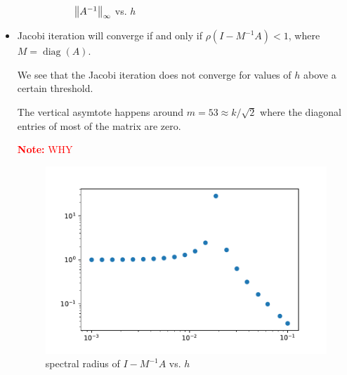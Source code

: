 \documentclass[10pt]{article}
\newcommand{\note}[1]{\textcolor{red}{\textbf{Note:} #1}}
\begin{document}
\begin{solution}[Solution]
\begin{itemize}
\begin{figure}[H]
\begin{subfigure}{.3\textwidth}
    \caption{\( \left\lVert A^{-1}\right\rVert_\infty \) vs. \( h \)}
\end{subfigure}
\caption{}
\label{}
\end{figure}


\item Jacobi iteration will converge if and only if \( \rho(I-M^{-1}A) < 1 \), where \( M = \operatorname{diag}(A) \).

We see that the Jacobi iteration does not converge for values of \( h \) above a certain threshold.

The vertical asymtote happens around \( m=53 \approx k/\sqrt{2} \) where the diagonal entries of most of the matrix are zero.

\note{WHY}

\begin{figure}[H]\centering
\includegraphics[width=.5\textwidth]{code/spect.pdf}
\caption{spectral radius of \( I-M^{-1}A \) vs. \( h \)}
\end{figure}

\end{itemize}
\end{solution}
\end{document}
